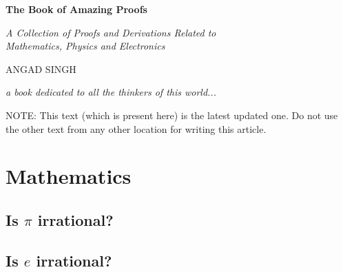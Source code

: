 \documentclass[12pt]{article}
\begin{document}
    \begin{center}
        \vspace*{0.5cm}
            
        \Huge
        \textbf{The Book of Amazing Proofs}
            
        \vspace{0.5cm}
        \Large
        \emph{A Collection of Proofs and Derivations Related to\\
        Mathematics, Physics and Electronics}

        
        \vspace{13.5cm}
        ANGAD SINGH\\
        \thispagestyle{empty}

        \vspace{5.5cm}
        \emph{a book dedicated to all the thinkers of this world...}\\
        
            
        
        \vspace{17.5cm}
        
        
    \end{center}


\tableofcontents
\newpage

NOTE: This text (which is present here) is the latest updated one. Do not use the other text from any other location for writing this article.

\section{Mathematics}
\subsection{Is $\pi$ irrational?}


\subsection{Is $e$ irrational?}
\end{document}
